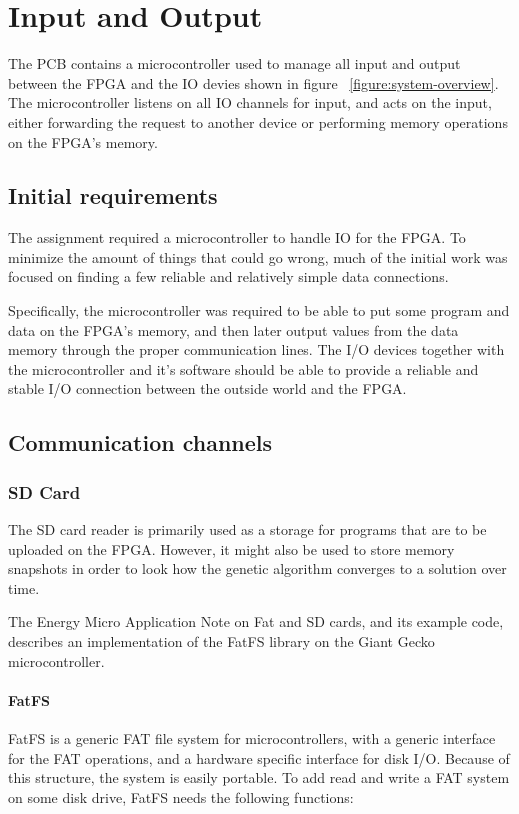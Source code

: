 \section{Input and Output}
The PCB contains a microcontroller used to manage all input and output between the FPGA and the IO devies shown in figure ~\vref{figure:system-overview}.
The microcontroller listens on all IO channels for input, and acts on the input, either forwarding the request to another device or performing memory operations on the FPGA's memory.

\subsection{Initial requirements}
The assignment required a microcontroller to handle IO for the FPGA.
To minimize the amount of things that could go wrong, much of the initial work was focused on finding a few reliable and relatively simple data connections.

Specifically, the microcontroller was required to be able to put some program and data on the FPGA's memory, and then later output values from the data memory through the proper communication lines.
The I/O devices together with the microcontroller and it's software should be able to provide a reliable and stable I/O connection between the outside world and the FPGA.

\subsection{Communication channels}
\subsubsection{SD Card}
The SD card reader is primarily used as a storage for programs that are to be uploaded on the FPGA.
However, it might also be used to store memory snapshots in order to look how the genetic algorithm converges to a solution over time.

The Energy Micro Application Note on Fat and SD cards, and its example code, describes an implementation of the FatFS library on the Giant Gecko microcontroller.\cite{an0030}

\paragraph{FatFS}\cite{fatfs-web}

FatFS is a generic FAT file system for microcontrollers, with a generic interface for the FAT operations, and a hardware specific interface for disk I/O.
Because of this structure, the system is easily portable.
To add read and write a FAT system on some disk drive, FatFS needs the following functions:

